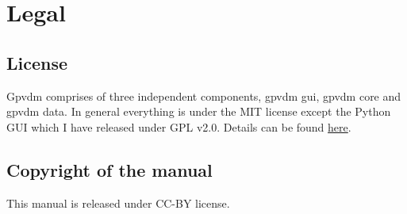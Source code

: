 \chapter{Legal}
\section{License}
Gpvdm comprises of three independent components, gpvdm gui, gpvdm core and gpvdm data.  In general everything is under the MIT license except the Python GUI which I have released under GPL v2.0. Details can be found \href{https://github.com/roderickmackenzie/gpvdm/blob/main/LICENSE.md}{here}.

\section{Copyright of the manual}
This manual is released under CC-BY license.



